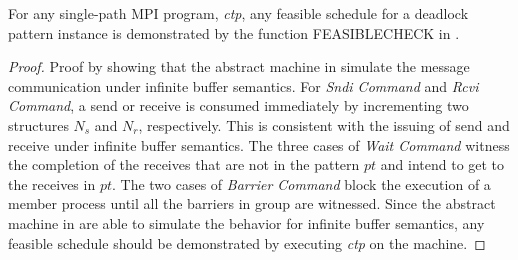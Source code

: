 \begin{lemma}
For any single-path MPI program, \textit{ctp}, any feasible schedule for a deadlock pattern instance is demonstrated by the function \textrm{FEASIBLECHECK} in . 
\label{lemma:complete}
\end{lemma}
\begin{proof}
Proof by showing that the abstract machine in  simulate the message communication under infinite buffer semantics. For \emph{Sndi Command} and \emph{Rcvi Command}, a send or receive is consumed immediately by incrementing two structures $\mathit{N_s}$ and $\mathit{N_r}$, respectively. This is consistent with the issuing of send and receive under infinite buffer semantics. The three cases of \emph{Wait Command} witness the completion of the receives that are not in the pattern $\mathit{pt}$ and intend to get to the receives in $\mathit{pt}$. The two cases of \emph{Barrier Command} block the execution of a member process until all the barriers in group are witnessed. Since the abstract machine in  are able to simulate the behavior for infinite buffer semantics, any feasible schedule should be demonstrated by executing \textit{ctp} on the machine.
\end{proof}
